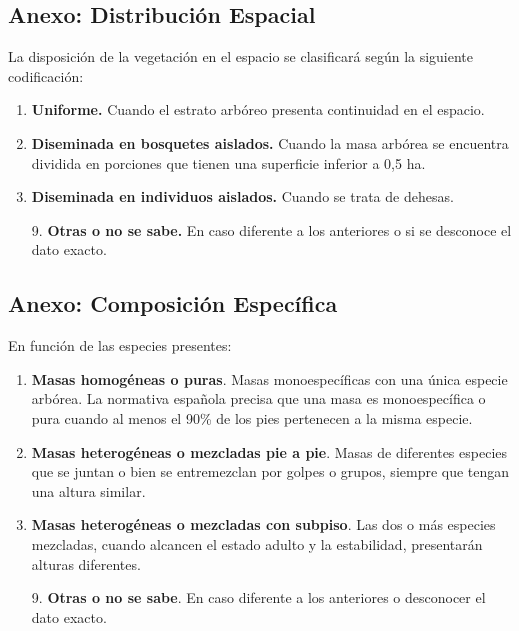 \subsection{Anexo: Distribución Espacial}\label{sec:disEsp}

La disposición de la vegetación en el espacio se clasificará según la siguiente codificación:

\begin{enumerate}
    \item \textbf{Uniforme.} Cuando el estrato arbóreo presenta continuidad en el espacio.

    \item \textbf{Diseminada en bosquetes aislados.} Cuando la masa arbórea se encuentra dividida en porciones que tienen una superficie inferior a 0,5 ha.

    \item \textbf{Diseminada en individuos aislados.} Cuando se trata de dehesas.

    \item[9.] \textbf{Otras o no se sabe.} En caso diferente a los anteriores o si se desconoce el dato exacto.
\end{enumerate}


\subsection{Anexo: Composición Específica}\label{anexo:compesp}

En función de las especies presentes:

\begin{enumerate}
    \item \textbf{Masas homogéneas o puras}. Masas monoespecíficas con una única especie arbórea. La normativa española precisa que una masa es monoespecífica o pura cuando al menos el 90\% de los pies pertenecen a la misma especie.
    
    \item \textbf{Masas heterogéneas o mezcladas pie a pie}. Masas de diferentes especies que se juntan o bien se entremezclan por golpes o grupos, siempre que tengan una altura similar.
    
    \item \textbf{Masas heterogéneas o mezcladas con subpiso}. Las dos o más especies mezcladas, cuando alcancen el estado adulto y la estabilidad, presentarán alturas diferentes.
    
    \item[9.] \textbf{Otras o no se sabe}. En caso diferente a los anteriores o desconocer el dato exacto.
\end{enumerate}



